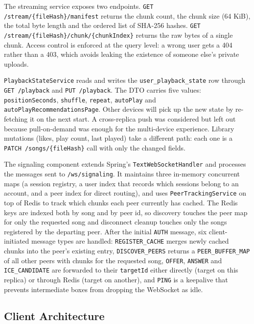 \indent \par The streaming service exposes two endpoints. \texttt{GET /stream/\{fileHash\}/manifest} returns the chunk count, the chunk size (64 KiB), the total byte length and the ordered list of SHA-256 hashes. \texttt{GET /stream/\{fileHash\}/chunk/\{chunkIndex\}} returns the raw bytes of a single chunk. Access control is enforced at the query level: a wrong user gets a 404 rather than a 403, which avoids leaking the existence of someone else's private uploads.

\indent \par \texttt{PlaybackStateService} reads and writes the \texttt{user\_playback\_state} row through \texttt{GET /playback} and \texttt{PUT /playback}. The DTO carries five values: \texttt{positionSeconds}, \texttt{shuffle}, \texttt{repeat}, \texttt{autoPlay} and \texttt{autoPlayRecommendationsPage}. Other devices will pick up the new state by re-fetching it on the next start. A cross-replica push was considered but left out because pull-on-demand was enough for the multi-device experience. Library mutations (likes, play count, last played) take a different path: each one is a \texttt{PATCH /songs/\{fileHash\}} call with only the changed fields.

\indent \par The signaling component extends Spring's \texttt{TextWebSocketHandler} and processes the messages sent to \texttt{/ws/signaling}. It maintains three in-memory concurrent maps (a session registry, a user index that records which sessions belong to an account, and a peer index for direct routing), and uses \texttt{PeerTrackingService} on top of Redis to track which chunks each peer currently has cached. The Redis keys are indexed both by song and by peer id, so discovery touches the peer map for only the requested song and disconnect cleanup touches only the songs registered by the departing peer. After the initial \texttt{AUTH} message, six client-initiated message types are handled: \texttt{REGISTER\_CACHE} merges newly cached chunks into the peer's existing entry, \texttt{DISCOVER\_PEERS} returns a \texttt{PEER\_BUFFER\_MAP} of all other peers with chunks for the requested song, \texttt{OFFER}, \texttt{ANSWER} and \texttt{ICE\_CANDIDATE} are forwarded to their \texttt{targetId} either directly (target on this replica) or through Redis (target on another), and \texttt{PING} is a keepalive that prevents intermediate boxes from dropping the WebSocket as idle.


\subsection{Client Architecture}
\label{sec:client-arch}

